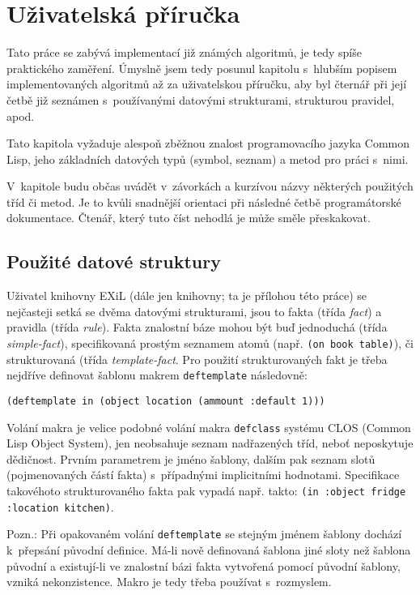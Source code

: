 \section{Uživatelská příručka}
Tato práce se zabývá implementací již známých algoritmů, je tedy spíše
praktického zaměření. Úmyslně jsem tedy posunul kapitolu s~hlubším popisem
implementovaných algoritmů až za uživatelskou příručku, aby byl čternář při
její četbě již seznámen s~používanými datovými strukturami, strukturou
pravidel, apod.

Tato kapitola vyžaduje alespoň zběžnou znalost programovacího jazyka
Common Lisp, jeho základních datových typů (symbol, seznam) a metod pro
práci s~nimi.

V~kapitole budu občas uvádět v~závorkách a kurzívou názvy některých použitých
tříd či metod. Je to kvůli snadnější orientaci při následné četbě programátorské
dokumentace. Čtenář, který tuto číst nehodlá je může směle přeskakovat.
\subsection{Použité datové struktury}
Uživatel knihovny \textsf{EXiL} (dále jen knihovny; ta je přílohou této práce)
se nejčasteji setká se dvěma datovými strukturami, jsou to fakta (třída
\emph{fact}) a pravidla (třída \emph{rule}). Fakta znalostní báze mohou být buď
jednoduchá (třída \emph{simple-fact}), specifikovaná prostým seznamem atomů (např.
\verb|(on book table)|), či strukturovaná (třída \emph{template-fact}. Pro
použití strukturovaných fakt je třeba nejdříve definovat šablonu makrem
\verb|deftemplate| následovně:
\begin{verbatim}
(deftemplate in (object location (ammount :default 1)))
\end{verbatim}
Volání makra je velice podobné volání makra \verb|defclass| systému \textsf{CLOS}
(Common Lisp Object System), jen neobsahuje seznam nadřazených tříd, neboť neposkytuje
dědičnost. Prvním parametrem je jméno šablony, dalším pak seznam slotů (pojmenovaných
částí fakta) s~případnými implicitními hodnotami. Specifikace takovéhoto
strukturovaného fakta pak vypadá např. takto:
\verb|(in :object fridge :location kitchen)|.

Pozn.: Při opakovaném volání \verb|deftemplate| se stejným jménem šablony
dochází k~přepsání původní definice. Má-li nově definovaná šablona jiné sloty
než šablona původní a existují-li ve znalostní bázi fakta vytvořená pomocí
původní šablony, vzniká nekonzistence. Makro je tedy třeba používat s~rozmyslem.

